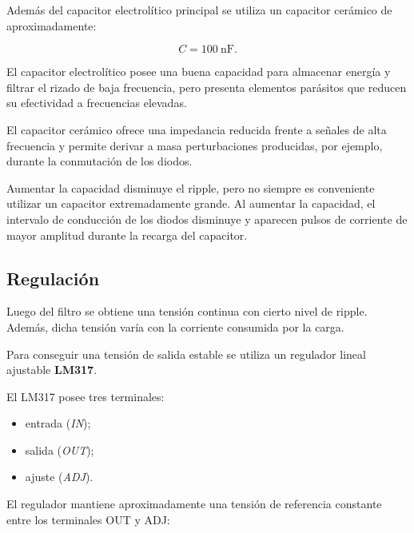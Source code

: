 \documentclass[12pt,a4paper]{article}
\begin{document}
	Además del capacitor electrolítico principal se utiliza un capacitor cerámico
	de aproximadamente:
	
	\begin{equation}
		C
		=
		100~\text{nF}.
	\end{equation}
	
	El capacitor electrolítico posee una buena capacidad para almacenar energía y
	filtrar el rizado de baja frecuencia, pero presenta elementos parásitos que
	reducen su efectividad a frecuencias elevadas.
	
	El capacitor cerámico ofrece una impedancia reducida frente a señales de alta
	frecuencia y permite derivar a masa perturbaciones producidas, por ejemplo,
	durante la conmutación de los diodos.
	
	\begin{tcolorbox}[
		colback=gray!5,
		colframe=black!50,
		title=Punto importante
		]
		Aumentar la capacidad disminuye el ripple, pero no siempre es conveniente
		utilizar un capacitor extremadamente grande. Al aumentar la capacidad, el
		intervalo de conducción de los diodos disminuye y aparecen pulsos de corriente
		de mayor amplitud durante la recarga del capacitor.
	\end{tcolorbox}
	
	\subsection{Regulación}
	
	Luego del filtro se obtiene una tensión continua con cierto nivel de ripple.
	Además, dicha tensión varía con la corriente consumida por la carga.
	
	Para conseguir una tensión de salida estable se utiliza un regulador lineal
	ajustable \textbf{LM317}.
	
	El LM317 posee tres terminales:
	
	\begin{itemize}
		\item entrada (\textit{IN});
		\item salida (\textit{OUT});
		\item ajuste (\textit{ADJ}).
	\end{itemize}
	
	El regulador mantiene aproximadamente una tensión de referencia constante entre
	los terminales OUT y ADJ:
	
\end{document}

